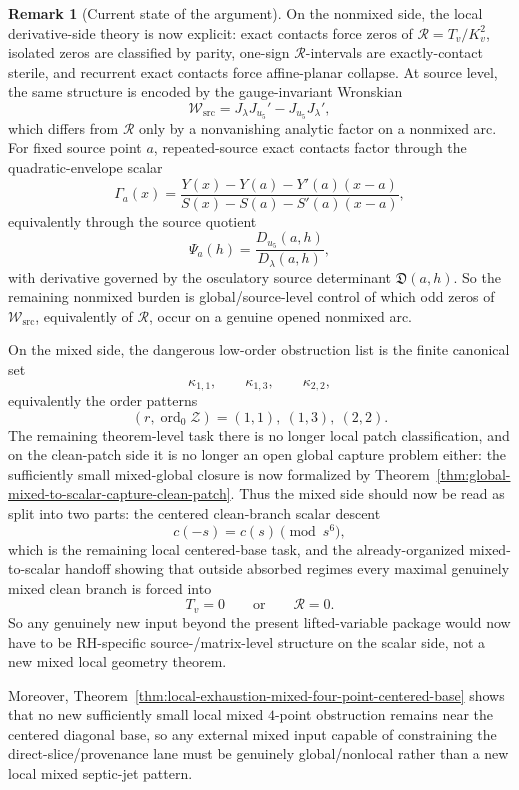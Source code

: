 \documentclass[11pt,a4paper]{amsart}
\theoremstyle{plain}
\theoremstyle{definition}
\newtheorem{remark}[theorem]{Remark}
\begin{document}
\begin{remark}[Current state of the argument]
On the nonmixed side, the local derivative-side theory is now explicit:
exact contacts force zeros of $\mathcal R=T_v/K_v^2$, isolated zeros are
classified by parity, one-sign $\mathcal R$-intervals are exactly-contact
sterile, and recurrent exact contacts force affine-planar collapse. At source
level, the same structure is encoded by the gauge-invariant Wronskian
\[
\mathcal W_{\mathrm{src}}=J_\lambda J_{u_5}'-J_{u_5}J_\lambda',
\]
which differs from $\mathcal R$ only by a nonvanishing analytic factor on a
nonmixed arc. For fixed source point $a$, repeated-source exact contacts
factor through the quadratic-envelope scalar
\[
\Gamma_a(x)=
\frac{Y(x)-Y(a)-Y'(a)(x-a)}
{S(x)-S(a)-S'(a)(x-a)},
\]
equivalently through the source quotient
\[
\Psi_a(h)=\frac{D_{u_5}(a,h)}{D_\lambda(a,h)},
\]
with derivative governed by the osculatory source determinant
$\mathfrak D(a,h)$. So the remaining nonmixed burden is global/source-level
control of which odd zeros of $\mathcal W_{\mathrm{src}}$, equivalently of
$\mathcal R$, occur on a genuine opened nonmixed arc.

On the mixed side, the dangerous low-order obstruction list is the finite
canonical set
\[
\kappa_{1,1},\qquad \kappa_{1,3},\qquad \kappa_{2,2},
\]
equivalently the order patterns
\[
(r,\operatorname{ord}_0\mathcal Z)=(1,1),\ (1,3),\ (2,2).
\]
The remaining theorem-level task there is no longer local patch classification,
and on the clean-patch side it is no longer an open global capture problem
either: the sufficiently small mixed-global closure is now formalized by
Theorem~\ref{thm:global-mixed-to-scalar-capture-clean-patch}. Thus the mixed
side should now be read as split into two parts: the centered clean-branch
scalar descent
\[
c(-s)=c(s)\pmod{s^6},
\]
which is the remaining local centered-base task, and the already-organized
mixed-to-scalar handoff showing that outside absorbed regimes every maximal
genuinely mixed clean branch is forced into
\[
T_v=0
\qquad\text{or}\qquad
\mathcal R=0.
\]
So any genuinely new input beyond the present lifted-variable package would now
have to be RH-specific source-/matrix-level structure on the scalar side, not a
new mixed local geometry theorem.

Moreover, Theorem~\ref{thm:local-exhaustion-mixed-four-point-centered-base}
shows that no new sufficiently small local mixed $4$-point obstruction remains
near the centered diagonal base, so any external mixed input capable of
constraining the direct-slice/provenance lane must be genuinely global/nonlocal
rather than a new local mixed septic-jet pattern.
\end{remark}
\end{document}
